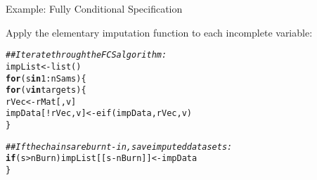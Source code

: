 \documentclass[10pt]{beamer}\usepackage[]{graphicx}\usepackage[]{color}
\makeatletter
\newcommand{\hlnum}[1]{\textcolor[rgb]{0.69,0.494,0}{#1}}%
\newcommand{\hlcom}[1]{\textcolor[rgb]{0.514,0.506,0.514}{\textit{#1}}}%
\newcommand{\hlopt}[1]{\textcolor[rgb]{0,0,0}{#1}}%
\newcommand{\hlstd}[1]{\textcolor[rgb]{0,0,0}{#1}}%
\newcommand{\hlkwa}[1]{\textcolor[rgb]{0,0,0}{\textbf{#1}}}%
\newcommand{\hlkwb}[1]{\textcolor[rgb]{0,0.341,0.682}{#1}}%
\newcommand{\hlkwd}[1]{\textcolor[rgb]{0.004,0.004,0.506}{#1}}%
\newenvironment{kframe}{%
 \def\at@end@of@kframe{}%
 \ifinner\ifhmode%
  \def\at@end@of@kframe{\end{minipage}}%
  \begin{minipage}{\columnwidth}%
 \fi\fi%
 \def\FrameCommand##1{\hskip\@totalleftmargin \hskip-\fboxsep
 \colorbox{shadecolor}{##1}\hskip-\fboxsep
     \hskip-\linewidth \hskip-\@totalleftmargin \hskip\columnwidth}%
 \MakeFramed {\advance\hsize-\width
   \@totalleftmargin\z@ \linewidth\hsize
   \@setminipage}}%
 {\par\unskip\endMakeFramed%
 \at@end@of@kframe}
\newenvironment{knitrout}{}{} %
\makeatother
\begin{document}
\begin{frame}[fragile]{Example: Fully Conditional Specification}
  
  Apply the elementary imputation function to each incomplete variable:
  
\begin{knitrout}\footnotesize
{}\color{fgcolor}\begin{kframe}
\begin{alltt}
\hlcom{## Iterate through the FCS algorithm:}
\hlstd{impList} \hlkwb{<-} \hlkwd{list}\hlstd{()}
\hlkwa{for}\hlstd{(s} \hlkwa{in} \hlnum{1} \hlopt{:} \hlstd{nSams) \{}
    \hlkwa{for}\hlstd{(v} \hlkwa{in} \hlstd{targets) \{}
        \hlstd{rVec}              \hlkwb{<-} \hlstd{rMat[ , v]}
        \hlstd{impData[}\hlopt{!}\hlstd{rVec, v]} \hlkwb{<-} \hlkwd{eif}\hlstd{(impData, rVec, v)}
    \hlstd{\}}

    \hlcom{## If the chains are burnt-in, save imputed datasets:}
    \hlkwa{if}\hlstd{(s} \hlopt{>} \hlstd{nBurn) impList[[s} \hlopt{-} \hlstd{nBurn]]} \hlkwb{<-} \hlstd{impData}
\hlstd{\}}
\end{alltt}


{\ttfamily\noindent\bfseries\color{errorcolor}{Error in matrix(cbind(1, data[!rVec, ])) \%*\% betaSam: requires numeric/complex matrix/vector arguments}}\end{kframe}
\end{knitrout}

\end{frame}

\end{document}
